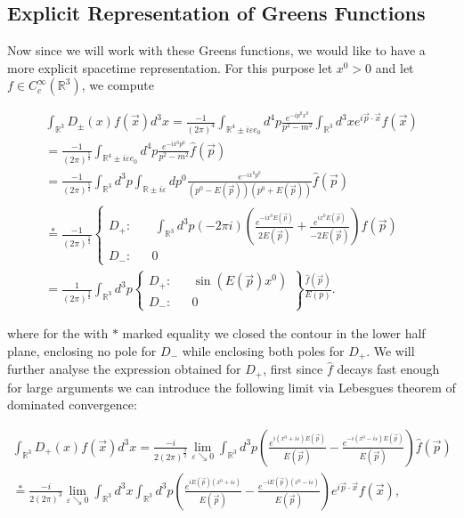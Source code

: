 \documentclass[a4paper,11pt]{article}
\begin{document}
\subsection{Explicit Representation of Greens Functions}

Now since we will work with these Greens functions, we would like to have a more explicit spacetime representation. 
For this purpose let \(x^0>0\) and let \(f\in C_c^\infty (\mathbb{R}^3)\), we compute

\begin{align}
\int_{\mathbb{R}^3} D_\pm (x) f(\vec{x})d^3x = \frac{-1}{(2\pi)^4} \int_{\mathbb{R}^4\pm i \varepsilon e_0} d^4p \frac{e^{-ip^0 x^0}}{p^2-m^2} \int_{\mathbb{R}^3} d^3x e^{i\vec{p}\cdot \vec{x}} f(\vec{x})\\
=\frac{-1}{(2\pi)^{\frac{5}{2}}} \int_{\mathbb{R}^4\pm i \varepsilon e_0} d^4p \frac{e^{-ix^0 p^0}}{p^2-m^2}\hat{f}(\vec{p})\\
=\frac{-1}{(2\pi)^{\frac{5}{2}}} \int_{\mathbb{R}^3} d^3p \int_{\mathbb{R}\pm i \varepsilon}dp^0 \frac{e^{-ix^0 p^0}}{(p^0-E(\vec{p}))(p^0+E(\vec{p}))}\hat{f}(\vec{p})\\\label{time sign change}
\overset{*}{=}\frac{-1}{(2\pi)^{\frac{5}{2}}}  \left\{\begin{matrix}D_+:&&~ \int_{\mathbb{R}^3}d^3p  (-2\pi i)\left(\frac{e^{-ix^0 E(\vec{p})}}{2E(\vec{p})}+\frac{e^{ix^0 E(\vec{p})}}{-2E(\vec{p})} \right) \hat{f}(\vec{p})
\\D_-:&& 0 \end{matrix} \right.\\
=\frac{1}{(2\pi)^{\frac{3}{2}}} \int_{\mathbb{R}^3} d^3p\left\{ \begin{matrix}D_+: &&\sin(E(\vec{p})x^0)\\D_-:  &&0 \end{matrix}\right\} \frac{\hat{f}(\vec{p})}{E(p)}.
\end{align}

where for the with \(*\) marked equality we closed the contour in the lower half plane, enclosing no pole for \(D_-\) while enclosing both
poles for \(D_+\). We will further analyse the expression obtained for \(D_+\), first since \(\hat{f}\) decays 
fast enough for large arguments we can introduce 
the following limit via Lebesgues theorem of dominated convergence:

\begin{align}
\int_{\mathbb{R}^3} D_+ (x) f(\vec{x})d^3x =\frac{-i}{2(2\pi)^{\frac{3}{2}}} \lim_{\varepsilon \searrow 0}\int_{\mathbb{R}^3} d^3p
\left( \frac{e^{i (x^0+i \varepsilon) E(\vec{p})}}{E(\vec{p})} - \frac{e^{-i (x^0-i \varepsilon)E(\vec{p})}}{E(\vec{p})} \right) \hat{f}(\vec{p})\\
\overset{*}{=} \frac{-i}{2(2\pi)^{3}} \lim_{\varepsilon \searrow 0}  \int_{\mathbb{R}^3} d^3 x \int_{\mathbb{R}^3} d^3 p 
\left( \frac{e^{i E(\vec{p})(x^0+i\varepsilon)}}{E(\vec{p})} 
-\frac{e^{-i E(\vec{p})(x^0-i\varepsilon)}}{E(\vec{p})} \right)e^{i\vec{p}\cdot \vec{x}}f(\vec{x}),
\end{align}
\end{document}
